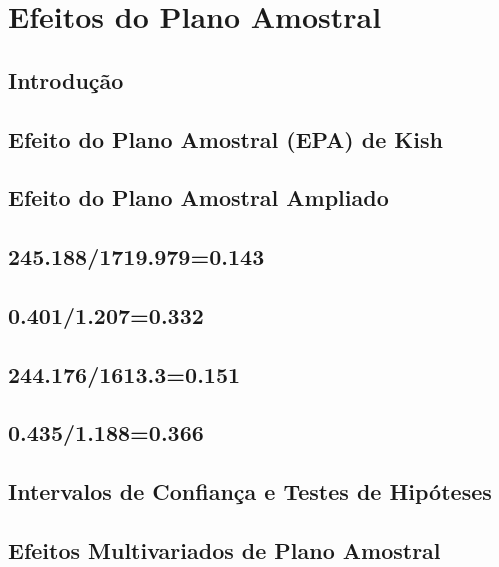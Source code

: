 \documentclass[]{book}
\theoremstyle{definition}
\theoremstyle{definition}
\theoremstyle{definition}
\theoremstyle{remark}
\begin{document}
\chapter{Efeitos do Plano Amostral}\label{epa}

\section{Introdução}\label{introducao}

\section{Efeito do Plano Amostral (EPA) de
Kish}\label{efeito-do-plano-amostral-epa-de-kish}

\section{Efeito do Plano Amostral
Ampliado}\label{efeito-do-plano-amostral-ampliado}

\section{245.188/1719.979=0.143}\label{section-20}

\section{0.401/1.207=0.332}\label{section-21}

\section{244.176/1613.3=0.151}\label{section-22}

\section{0.435/1.188=0.366}\label{section-23}

\section{Intervalos de Confiança e Testes de Hipóteses}\label{icth}

\section{Efeitos Multivariados de Plano
Amostral}\label{efeitos-multivariados-de-plano-amostral}
\end{document}
